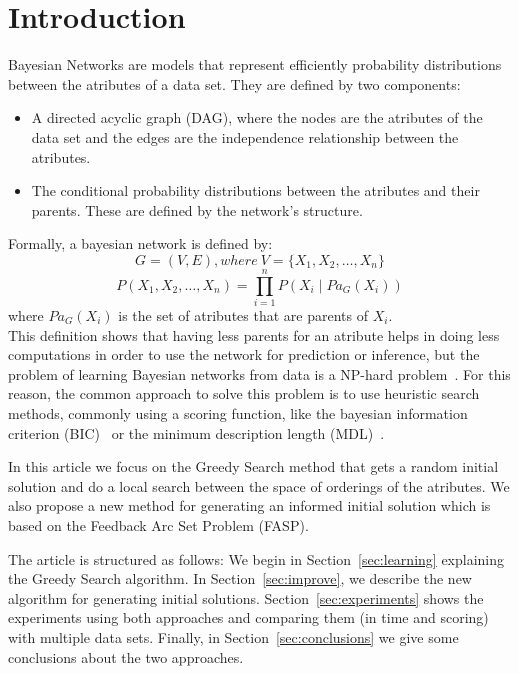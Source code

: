\section{Introduction}
\label{sec:introduction}

Bayesian Networks are models that represent efficiently probability distributions between the atributes of a data set. They are defined by two components:
\begin{itemize}
	\item A directed acyclic graph (DAG), where the nodes are the atributes of the data set and the edges are the independence relationship between the atributes.
	\item The conditional probability distributions between the atributes and their parents. These are defined by the network's structure.
\end{itemize}
Formally, a bayesian network is defined by:
\[ G = ( V , E ), where\ V = \{ X_1 , X_2 , \ldots , X_n \} \]
\[ P( X_1 , X_2 , \ldots , X_n ) = \prod_{i=1}^{n} P( X_i \mid {Pa}_G( X_i ) ) \]
where ${Pa}_G( X_i )$ is the set of atributes that are parents of $X_i$.\\

This definition shows that having less parents for an atribute helps in doing less computations in order to use the network for prediction or inference, but the problem of learning Bayesian networks from data is a NP-hard problem~\cite{MSResearch04}. For this reason, the common approach to solve this problem is to use heuristic search methods, commonly using a scoring function, like the bayesian information criterion (BIC)~\cite{BIC91} or the minimum description length (MDL)~\cite{MDL94}.

In this article we focus on the Greedy Search method that gets a random initial solution and do a local search between the space of orderings of the atributes. We also propose a new method for generating an informed initial solution which is based on the Feedback Arc Set Problem (FASP).

The article is structured as follows: We begin in Section~\ref{sec:learning} explaining the Greedy Search algorithm. In Section~\ref{sec:improve}, we describe the new algorithm for generating initial solutions. Section~\ref{sec:experiments} shows the experiments using both approaches and comparing them (in time and scoring) with multiple data sets. Finally, in Section~\ref{sec:conclusions} we give some conclusions about the two approaches.